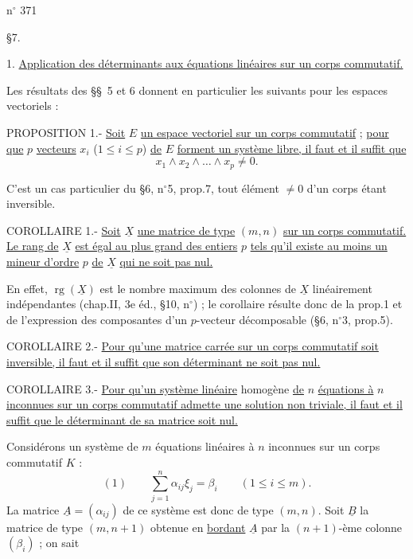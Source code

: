 
\hfill n$^\circ$ 371

\S7. 

1. \uline{Application des déterminants aux équations linéaires sur un corps commutatif.}

Les résultats des \S\S\ 5 et 6 donnent en particulier les suivants pour les
espaces vectoriels :

PROPOSITION 1.- \uline{Soit} $E$ \uline{un espace vectoriel sur un corps commutatif} ; \uline{pour que} $p$
\uline{vecteurs} $x_i$ ($1\leq i\leq p$) \uline{de} $E$ \uline{forment un système libre, il faut et il suffit que}
\[
x_1\wedge x_2\wedge\ldots\wedge x_p\ne0.
\]

C'est un cas particulier du \S6, n$^\circ$5, prop.7, tout élément $\ne0$ d'un corps étant
inversible.

COROLLAIRE 1.- \uline{Soit} $\underline X$ \uline{une matrice de type} $(m,n)$ \uline{sur un corps commutatif. Le rang
de} $\underline X$ \uline{est égal au plus grand des entiers} $p$ \uline{tels qu'il existe au moins un mineur
d'ordre} $p$ \uline{de} $\underline X$ \uline{qui ne soit pas nul.}

En effet, $\operatorname{rg}(\underline X)$ est le nombre maximum des colonnes de $\underline X$ linéairement indépendantes
(chap.II, 3e éd., \S10, n$^\circ$\quad ) ; le corollaire résulte donc de la prop.1 et de
l'expression des composantes d'un $p$-vecteur décomposable (\S6, n$^\circ$3, prop.5).

COROLLAIRE 2.- \uline{Pour qu'une matrice carrée sur un corps commutatif soit inversible,
il faut et il suffit que son déterminant ne soit pas nul.}

COROLLAIRE 3.- \uline{Pour qu'un système linéaire} homogène \uline{de} $n$ \uline{équations à} $n$ \uline{inconnues
sur un corps commutatif admette une solution non triviale, il faut et il suffit que
le déterminant de sa matrice soit nul.}

Considérons un système de $m$ équations linéaires à $n$ inconnues sur un corps commutatif $K$ :
\[
(1)\qquad\sum_{j=1}^n\alpha_{ij}\xi_j=\beta_i\qquad(1\leq i\leq m).
\]
La matrice $\underline A=(\alpha_{ij})$ de ce système est donc de type $(m,n)$. Soit $\underline B$ la matrice
de type $(m,n+1)$ obtenue en \uline{bordant} $\underline A$ par la $(n+1)$-ème colonne $(\beta_i)$ ; on sait

